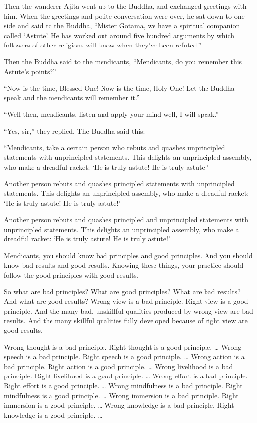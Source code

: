 \documentclass[12pt,openany]{book}%
\begin{document}
Then the wanderer Ajita went up to the Buddha, and exchanged greetings with him. When the greetings and polite conversation were over, he sat down to one side and said to the Buddha, “Mister Gotama, we have a spiritual companion called ‘Astute’. He has worked out around five hundred arguments by which followers of other religions will know when they’ve been refuted.” 

Then the Buddha said to the mendicants, “Mendicants, do you remember this Astute’s points?” 

“Now is the time, Blessed One! Now is the time, Holy One! Let the Buddha speak and the mendicants will remember it.” 

“Well then, mendicants, listen and apply your mind well, I will speak.” 

“Yes, sir,” they replied. The Buddha said this: 

“Mendicants, take a certain person who rebuts and quashes unprincipled statements with unprincipled statements. This delights an unprincipled assembly, who make a dreadful racket: ‘He is truly astute! He is truly astute!’ 

Another person rebuts and quashes principled statements with unprincipled statements. This delights an unprincipled assembly, who make a dreadful racket: ‘He is truly astute! He is truly astute!’ 

Another person rebuts and quashes principled and unprincipled statements with unprincipled statements. This delights an unprincipled assembly, who make a dreadful racket: ‘He is truly astute! He is truly astute!’ 

Mendicants, you should know bad principles and good principles. And you should know bad results and good results. Knowing these things, your practice should follow the good principles with good results. 

So what are bad principles? What are good principles? What are bad results? And what are good results? Wrong view is a bad principle. Right view is a good principle. And the many bad, unskillful qualities produced by wrong view are bad results. And the many skillful qualities fully developed because of right view are good results. 

Wrong thought is a bad principle. Right thought is a good principle. … Wrong speech is a bad principle. Right speech is a good principle. … Wrong action is a bad principle. Right action is a good principle. … Wrong livelihood is a bad principle. Right livelihood is a good principle. … Wrong effort is a bad principle. Right effort is a good principle. … Wrong mindfulness is a bad principle. Right mindfulness is a good principle. … Wrong immersion is a bad principle. Right immersion is a good principle. … Wrong knowledge is a bad principle. Right knowledge is a good principle. … 
\end{document}
